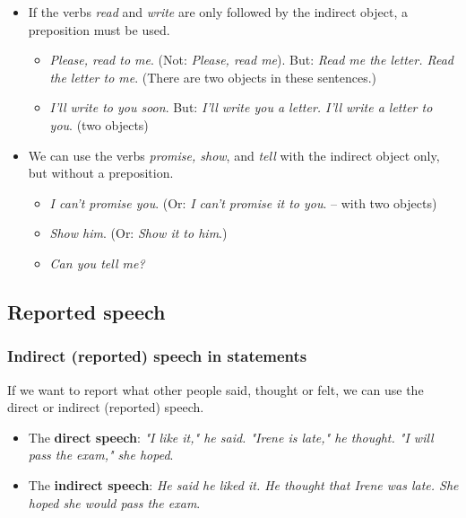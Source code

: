 \begin{itemize}

\item  If the verbs \textit{read} and \textit{write} are only followed by the indirect object, a preposition must be used.

\begin{itemize}

\item \textit{Please, read to me}. (Not: \textit{Please, read me}).
But: \textit{Read me the letter. Read the letter to me}. (There are two objects in these sentences.)

\item \textit{I'll write to you soon}.
But: \textit{I'll write you a letter. I'll write a letter to you}. (two objects)
\end{itemize}

\item We can use the verbs \textit{promise, show}, and \textit{tell} with the indirect object only, but without a preposition.

\begin{itemize}

\item \textit{I can't promise you}.  (Or: \textit{I can't promise it to you}. – with two objects) 
\item \textit{Show him}. (Or: \textit{Show it to him}.) 
\item \textit{Can you tell me?}

\end{itemize}

\end{itemize}

\subsection{Reported speech}

\subsubsection{Indirect (reported) speech in statements}

If we want to report what other people said, thought or felt, we can use the direct or indirect (reported) speech. 

\begin{itemize}

\item The \textbf{direct speech}: \textit{"I like it," he said. "Irene is late," he thought. "I will pass the exam," she hoped}.
\item The \textbf{indirect speech}: \textit{He said he liked it. He thought that Irene was late. She hoped she would pass the exam}.
\end{itemize}

